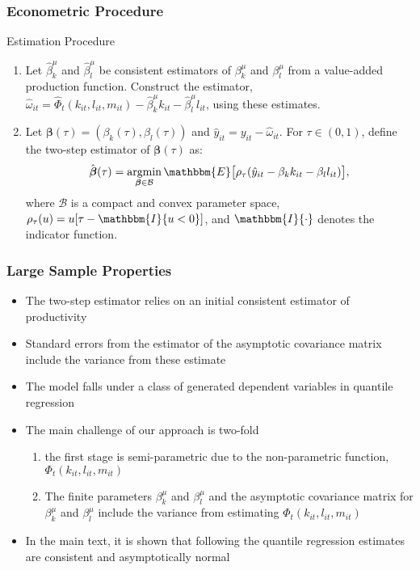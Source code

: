\documentclass[xcolor={dvipsnames}, notheorems]{beamer}
\theoremstyle{plain}
\begin{document}
\begin{frame}
\frametitle{Econometric Procedure}
\begin{block}{Estimation Procedure}
\begin{enumerate}
    \item Let $\hat{\beta}_{k}^{\mu}$ and $\hat{\beta}_{l}^{\mu}$ be consistent estimators of $\beta_{k}^{\mu}$ and $\beta_{l}^{\mu}$ from a value-added production function. Construct the estimator, $\hat{\omega}_{it}=\hat{\Phi}_{t}(k_{it}, l_{it}, m_{it})-\hat{\beta}^{\mu}_{k}k_{it}-\hat{\beta}^{\mu}_{l}l_{it}$, using these estimates.
    \item Let $\boldsymbol{\beta}(\tau)=(\beta_{k}(\tau), \beta_{l}(\tau))$ and $\hat{y}_{it}=y_{it}-\hat{\omega}_{it}$. For $\tau \in (0, 1)$, define the two-step estimator of $\boldsymbol{\beta}(\tau)$ as:
    \begin{equation*}
    \hat{\boldsymbol{\beta}}(\tau)=\underset{\boldsymbol{\beta}\in\mathcal{B}}{\operatorname{argmin}}\, \mathbbm{E}\big[\rho_{\tau}(\hat{y}_{it}-\beta_{k}k_{it}-\beta_{l}l_{it})\big],
    \end{equation*}
    where $\mathcal{B}$ is a compact and convex parameter space, $\rho_{\tau}(u)=u[\tau-\mathbbm{I}\{u<0\}]$, and $\mathbbm{I}\{\cdot\}$ denotes the indicator function.
\end{enumerate}
\end{block}
\end{frame}


\begin{frame}
\frametitle{Large Sample Properties}
\begin{itemize}
	\item The two-step estimator relies on an initial consistent estimator of productivity
	\item Standard errors from the estimator of the asymptotic covariance matrix include the variance from these estimate
	\item  The model falls under a class of generated dependent variables in quantile regression
	\item The main challenge of our approach is two-fold
	\begin{enumerate}
		\item the first stage is semi-parametric due to the non-parametric function, $\Phi_{t}(k_{it}, l_{it}, m_{it})$
		\item The finite parameters $\beta_{k}^{\mu}$ and $\beta_{l}^{\mu}$ and the asymptotic covariance matrix for $\beta_{k}^{\mu}$ and $\beta_{l}^{\mu}$ include the variance from estimating $\Phi_{t}(k_{it}, l_{it}, m_{it})$
	\end{enumerate}
	\item In the main text, it is shown that following \cite{Chernozhukov2005} the quantile regression estimates are consistent and asymptotically normal
\end{itemize}
\end{frame}
\end{document}
